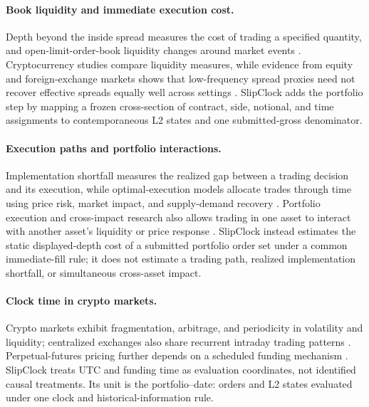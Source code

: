 \documentclass[sigconf]{acmart}
\begin{document}
\paragraph{Book liquidity and immediate execution cost.}
Depth beyond the inside spread measures the cost of trading a specified quantity, and open-limit-order-book liquidity changes around market events \cite{irvine2000liquidity,gomber2015liquidity}. Cryptocurrency studies compare liquidity measures, while evidence from equity and foreign-exchange markets shows that low-frequency spread proxies need not recover effective spreads equally well across settings \cite{brauneis2021,jahanparvar2023lowfrequency}. SlipClock adds the portfolio step by mapping a frozen cross-section of contract, side, notional, and time assignments to contemporaneous L2 states and one submitted-gross denominator.

\paragraph{Execution paths and portfolio interactions.}
Implementation shortfall measures the realized gap between a trading decision and its execution, while optimal-execution models allocate trades through time using price risk, market impact, and supply-demand recovery \cite{perold1988implementation,almgren2001,obizhaeva2013}. Portfolio execution and cross-impact research also allows trading in one asset to interact with another asset's liquidity or price response \cite{tsoukalas2019dynamic,min2022crosssectional}. SlipClock instead estimates the static displayed-depth cost of a submitted portfolio order set under a common immediate-fill rule; it does not estimate a trading path, realized implementation shortfall, or simultaneous cross-asset impact.

\paragraph{Clock time in crypto markets.}
Crypto markets exhibit fragmentation, arbitrage, and periodicity in volatility and liquidity; centralized exchanges also share recurrent intraday trading patterns \cite{makarov2020trading,hansen2024,brauneis2025}. Perpetual-futures pricing further depends on a scheduled funding mechanism \cite{ackerer2026perpetual}. SlipClock treats UTC and funding time as evaluation coordinates, not identified causal treatments. Its unit is the portfolio--date: orders and L2 states evaluated under one clock and historical-information rule.
\end{document}
